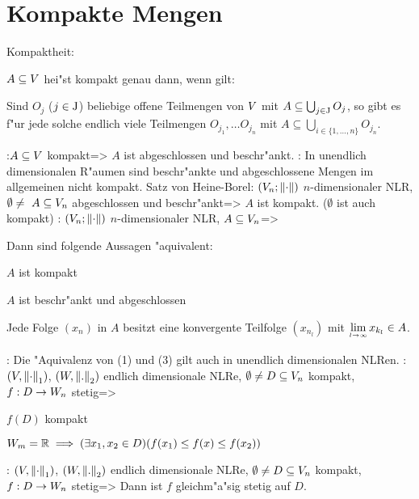 \section{Kompakte Mengen}
 Kompaktheit:{
  $A\subseteq V$ hei"st kompakt genau dann, wenn gilt:
  
  Sind $O_j$ ($j\in{\rm J}$) beliebige offene Teilmengen von $V$ mit 
  $A\subseteq\bigcup_{j\in{\rm J}} O_j$, so gibt es f"ur jede solche
   endlich viele Teilmengen
  $O_{j_1},\ldots O_{j_n}$ mit $A\subseteq\bigcup_{i\in \{1,\ldots,n\}} O_{j_n}$.
  }
\theorem:$A\subseteq V$ kompakt=>{
  $A$ ist abgeschlossen und beschr"ankt.
  }
\remark:{
  In unendlich dimensionalen R"aumen sind beschr"ankte und abgeschlossene
  Mengen im allgemeinen nicht kompakt.
  }
\theorem Satz von Heine-Borel:
$(V_n;{\left\| \cdot\right\|})$ $n$-dimensionaler NLR, $\emptyset\neq\ A\subseteq V_n$
  abgeschlossen und beschr"ankt=>{
  $A$ ist kompakt. ($\emptyset$ ist auch kompakt)
  }
\theorem:
$(V_n;{\left\| \cdot\right\|})$ $n$-dimensionaler NLR, $A\subseteq V_n$=>{
  Dann sind folgende Aussagen "aquivalent:
  \begin{stmts}
    \item $A$ ist kompakt
    \item $A$ ist beschr"ankt und abgeschlossen
    \item Jede Folge $(x_n)$ in $A$ besitzt eine konvergente Teilfolge 
      $(x_{n_l})$ mit $\limes l->\infty x_{k_l}\in A$.
    \end{stmts}
  }
\remark:{
  Die "Aquivalenz von (1) und (3) gilt auch in unendlich dimensionalen NLRen.
  }
\theorem:
  $(V,{\left\| \cdot\right\|}_1)$, $(W,{\left\| .\right\|}_2)$ endlich dimensionale NLRe, 
  $\emptyset\neq D\subseteq V_n$ kompakt,
  $f:D\to W_n$ stetig=>{
  \begin{stmts}
    \item $f(D)$ kompakt
    \item $W_m=\mathbb R \implies (\exists x_1,x_2\in D)(f(x_1)\leq f(x)\leq f(x_2))$
    \end{stmts}
  }
\theorem:
  $(V,{\left\| \cdot\right\|}_1)$, $(W,{\left\| .\right\|}_2)$ endlich dimensionale NLRe, 
  $\emptyset\neq D\subseteq V_n$ kompakt,
  $f:D\to W_n$ stetig=>{ 
  Dann ist $f$ gleichm"a"sig stetig auf $D$. 
  }
